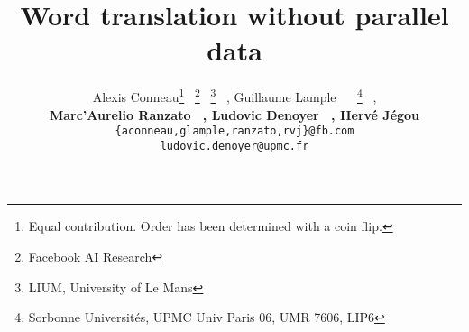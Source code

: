 \documentclass{article} \usepackage{iclr2018_conference,times}
\title{Word translation without parallel data}
\author{Alexis Conneau\thanks{Equal contribution. Order has been determined with a coin flip.}~ 
\thanks{Facebook AI Research}~ \thanks{LIUM, University of Le Mans}~ , 
Guillaume Lample\footnotemark[1]~ \footnotemark[2]~ \thanks{Sorbonne Universit\'es, UPMC Univ Paris 06, UMR 7606, LIP6}~ ,\\
\textbf{Marc'Aurelio Ranzato\footnotemark[2]~ , Ludovic Denoyer\footnotemark[4]~ , Herv\'e J\'egou\footnotemark[2]} \\
  \texttt{\{aconneau,glample,ranzato,rvj\}@fb.com} \\
  \texttt{ludovic.denoyer@upmc.fr}\\
  }
\newcommand{\hub}{CSLS\xspace}
\newcommand{\isf}{ISF\xspace}
\begin{document}
\maketitle



\def\mysp{\hspace{4.5pt}}



\newcommand{\insertwordtranslationall}{
    \begin{table*}[b]
\small
\begin{tabular}[b]{@{\mysp}l@{\mysp}|@{\mysp}c@{\mysp}|@{\mysp}c@{\mysp}|@{\mysp}c@{\mysp}|@{\mysp}c@{\mysp}|@{\mysp}c@{\mysp}|@{\mysp}c@{\mysp}}
            & en-es \ es-en & en-fr \ fr-en        & en-de \ de-en        & en-ru \ ru-en                 & en-zh         \ zh-en    & en-eo         \ eo-en         \\
    			\hline
    			\hline
    			\multicolumn{7}{l}{\it Methods with cross-lingual supervision and fastText embeddings} \\ 
    			\hline
    			Procrustes - NN      & 77.4  \ \ 77.3  & 74.9 \ \ 76.1          & 68.4 \ \ 67.7          & 47.0 \ \ 58.2                   & 40.6          \ \ 30.2          & 22.1 \ \ 20.4 \\
    			Procrustes - \isf   & 81.1  \ \ 82.6  & 81.1 \ \ 81.3          & 71.1 \ \ 71.5          & 49.5 \ \ 63.8                   & 35.7          \ \ \textbf{37.5} & 29.0 \ \ 27.9 \\
    			Procrustes - \hub     & 81.4  \ \ 82.9  & 81.1 \ \ \textbf{82.4} & 73.5 \ \ \textbf{72.4} & \textbf{51.7} \ \ \textbf{63.7} & \textbf{42.7} \ \ 36.7         & \textbf{29.3} \ \ 25.3 \\
    			\hline
    			\hline
    			\multicolumn{7}{l}{\it Methods without cross-lingual supervision and fastText embeddings} \\ 
    			\hline
    			Adv - NN               & 69.8 \ \ 71.3 & 70.4 \ \ 61.9 & 63.1 \ \ 59.6 & 29.1 \ \ 41.5 & 18.5 \ \ 22.3 & 13.5 \ \ 12.1 \\
    			Adv - \hub             & 75.7 \ \ 79.7 & 77.8 \ \ 71.2 & 70.1 \ \ 66.4 & 37.2 \ \ 48.1 & 23.4 \ \ 28.3 & 18.6 \ \ 16.6 \\
    			Adv - Refine - NN & 79.1 \ \ 78.1 & 78.1 \ \ 78.2 & 71.3 \ \ 69.6 & 37.3 \ \ 54.3 & 30.9 \ \ 21.9 & 20.7 \ \ 20.6 \\

    			Adv - Refine - \hub & \textbf{81.7} \ \ \textbf{83.3} & \textbf{82.3} \ \ 82.1 & \textbf{74.0} \ \ 72.2 & 44.0 \ \ 59.1 & 32.5 \ \ 31.4 & 28.2 \ \ \textbf{25.6} \\
    			\hline
    		\end{tabular}
    		\caption{\textbf{Word translation retrieval P@1 for our released vocabularies in various language pairs.} We consider 1,500 source test queries, and 200k target words for each language pair. We use fastText embeddings trained on Wikipedia. NN: nearest neighbors. ISF: inverted softmax. ('en' is English, 'fr' is French, 'de' is German, 'ru' is Russian, 'zh' is classical Chinese and 'eo' is Esperanto)
    		\label{tab:word_translation_all}}
\end{table*}
}
\end{document}
